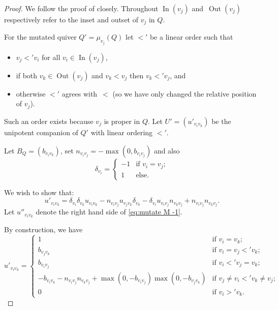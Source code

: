 \documentclass[11pt, letterpaper]{amsart}
\theoremstyle{definition}
\numberwithin{equation}{section}
\def\In{{\operatorname{In}}}
\def\Out{{\operatorname{Out}}}
\begin{document}
\begin{proof}
We follow the proof of \cite[Lemma 7.2]{COQ} closely. 
Throughout $\In(v_j)$ and~$\Out(v_j)$ respectively refer to the inset and outset of $v_j$ in $Q$.

For the mutated quiver $Q' = \mu_{v_j}(Q)$ let $<'$ be a linear order such that 
\begin{itemize}
\item $v_j <' v_i$ for all $v_i \in \In(v_j)$, 
\item if both $v_k \in \Out(v_j)$ and $v_k < v_j$ then $v_k <' v_j$, and %
\item otherwise $<'$ agrees with~$<$ (so we have only changed the relative position of $v_j$).
\end{itemize}
Such an order exists because $v_j$ is proper in $Q$.
Let $U'=(u'_{v_i v_k})$ be the unipotent companion of $Q'$ with linear ordering $<'$.

Let $B_Q = (b_{v_iv_k})$, set $n_{v_iv_j} = -\max(0, b_{v_iv_j})$ and also %
$$\delta_{v_i} = \begin{cases} -1 & \text{if } v_i=v_j; \\ 1 & \text{else.} \end{cases}$$

We wish to show that:
\begin{equation} %
\label{eq:mutate M -1}
u'_{v_iv_k} = \delta_{v_i} \delta_{v_k} u_{v_i v_k} - n_{v_i v_j} u_{v_j v_k} \delta_{v_k} - \delta_{v_i} u_{v_i v_j} n_{v_k v_j} + n_{v_i v_j} n_{v_k v_j}.
\end{equation}
Let $u''_{v_i v_k}$ denote the right hand side of \eqref{eq:mutate M -1}.

By construction, we have 
\begin{equation*}
u'_{v_i v_k} = \begin{cases} 
1 & \text{if } v_i=v_k; \\
 b_{v_j v_k} & \text{if } v_i=v_j <' v_k; \\ 
 b_{v_i v_j} & \text{if } v_i <' v_j=v_k; \\
 -b_{v_i v_k} - n_{v_i v_j} n_{v_k v_j} + \max(0, -b_{v_i v_j}) \max(0, -b_{v_j v_k}) & 
 \text{if }  v_j \neq v_i <' v_k \neq v_j; \\ %
 0 & \text{if } v_i >' v_k.
\end{cases}
\end{equation*}


\end{proof}
\end{document}
